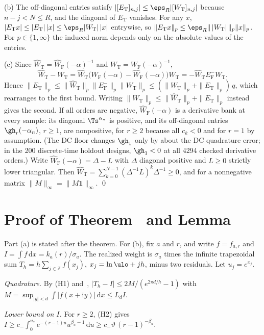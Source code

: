 (b) The off-diagonal entries satisfy $|[E_{\mathrm T}]_{n,j}|\le\eps_R|[W_{\mathrm T}]_{n,j}|$ because $n-j<N\le R$, and the diagonal of $E_{\mathrm T}$ vanishes. For any $x$, $|E_{\mathrm T}x|\le|E_{\mathrm T}|\,|x|\le\eps_R|W_{\mathrm T}|\,|x|$ entrywise, so $\|E_{\mathrm T}x\|_p\le\eps_R\|\,|W_{\mathrm T}|\,\|_p\|x\|_p$. For $p\in\{1,\infty\}$ the induced norm depends only on the absolute values of the entries.

(c) Since $\hat W_{\mathrm T}=\hat W_{\mathrm F}(-\alpha)^{-1}$ and $W_{\mathrm T}=W_{\mathrm F}(-\alpha)^{-1}$,
\[
\hat W_{\mathrm T}-W_{\mathrm T}=\hat W_{\mathrm T}\big(W_{\mathrm F}(-\alpha)-\hat W_{\mathrm F}(-\alpha)\big)W_{\mathrm T}=-\hat W_{\mathrm T}E^-_{\mathrm F}W_{\mathrm T}.
\]
Hence $\|E_{\mathrm T}\|_p\le\|\hat W_{\mathrm T}\|_p\|E^-_{\mathrm F}\|_p\|W_{\mathrm T}\|_p\le(\|W_{\mathrm T}\|_p+\|E_{\mathrm T}\|_p)\,q$, which rearranges to the first bound. Writing $\|W_{\mathrm T}\|_p\le\|\hat W_{\mathrm T}\|_p+\|E_{\mathrm T}\|_p$ instead gives the second. If all orders are negative, $\hat W_{\mathrm F}(-\alpha)$ is a derivative bank at every sample: its diagonal $\Ts^{\alpha_n}$ is positive, and its off-diagonal entries $\gh_r(-\alpha_n)$, $r\ge1$, are nonpositive, for $r\ge2$ because all $c_k<0$ and for $r=1$ by assumption. (The DC floor changes $\gh_1$ only by about the DC quadrature error; in the 200 discrete-time holdout designs, $\gh_1<0$ at all 4294 checked derivative orders.) Write $\hat W_{\mathrm F}(-\alpha)=\Delta-L$ with $\Delta$ diagonal positive and $L\ge0$ strictly lower triangular. Then $\hat W_{\mathrm T}=\sum_{k=0}^{N-1}(\Delta^{-1}L)^k\Delta^{-1}\ge0$, and for a nonnegative matrix $\|M\|_\infty=\|M\mathbf 1\|_\infty$. \qed

\section{Proof of Theorem~ and Lemma~}\label{app:cm}

Part (a) is stated after the theorem. For (b), fix $a$ and $r$, and write $f=f_{a,r}$ and $I=\int f\,\mathrm dx=k_a(r)/\sigma_a$. The realized weight is $\sigma_a$ times the infinite trapezoidal sum $T_h=h\sum_{j\in\mathbb Z}f(x_j)$, $x_j=\ln\ulo+jh$, minus two residuals. Let $u_j=e^{x_j}$.

\emph{Quadrature.} By (H1) and~\cite[Thm.~5.1]{trefethen2014}, $|T_h-I|\le2M/(e^{2\pi d/h}-1)$ with $M=\sup_{|y|<d}\int|f(x+\mathrm iy)|\,\mathrm dx\le L_dI$.

\emph{Lower bound on $I$.} For $r\ge2$, (H2) gives $I\ge c_-\int_0^{u_*}e^{-(r-1)u}u^{\beta_a-1}\,\mathrm du\ge c_-\vartheta\,(r-1)^{-\beta_a}$.

